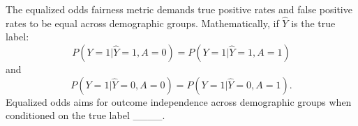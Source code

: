 The equalized odds fairness metric demands true positive rates and false positive rates to be equal across demographic groups. Mathematically, if $\hat{Y}$ is the true label:
%
\vspace{-0.1cm}\begin{equation}
P(Y\!=\!1|\hat{Y}\!=\!1, A\!=\!0) \!=\! P(Y\!=\!1|\hat{Y}\!=\!1, A\!=\!1)
\end{equation}
%
and
%
\vspace{-0.1cm}\begin{equation}
P(Y\!=\!1|\hat{Y}\!=\!0, A\!=\!0) \!=\! P(Y\!=\!1|\hat{Y}\!=\!0, A\!=\!1).
\end{equation}
%
Equalized odds aims for outcome independence across demographic groups when conditioned on the true label ____. %

%
%

%
%

